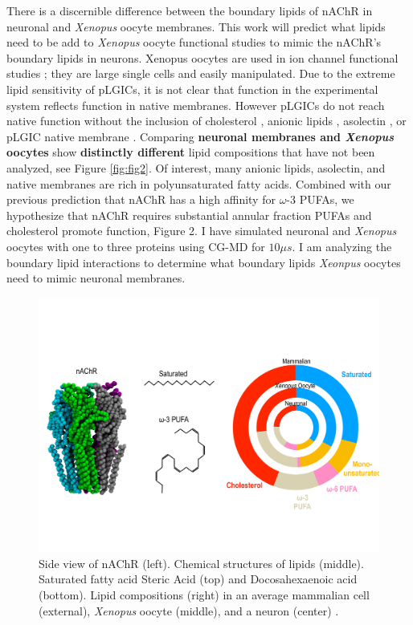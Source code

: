 \documentclass[9pt]{extarticle} %
\begin{document}
There is a discernible difference between the boundary lipids of nAChR in neuronal and \textit{Xenopus} oocyte membranes. This work will predict what lipids need to be add to \textit{Xenopus} oocyte functional studies to mimic the nAChR's boundary lipids in neurons. Xenopus oocytes are used in ion channel functional studies \cite{Conti2013,Cornelison2016,Lee1994}; they are large single cells and easily manipulated. Due to the extreme lipid sensitivity of pLGICs, it is not clear that function in the experimental system reflects function in native membranes. However pLGICs do not reach native function without the inclusion of cholesterol \cite{Fong1987,Jones1988}, anionic lipids \cite{RyanSEDemersCNChewJP1996}, asolectin \cite{Fong1986,Fong1987}, or pLGIC native membrane \cite{Conti2013}. Comparing \textbf{neuronal membranes and \textit{Xenopus} oocytes} show \textbf{distinctly different} lipid compositions that have not been analyzed, see Figure \ref{fig:fig2}.  Of interest, many anionic lipids, asolectin, and native membranes are rich in polyunsaturated fatty acids. Combined with our previous prediction that nAChR has a high affinity for $\omega$-3 PUFAs, we hypothesize that nAChR requires substantial annular fraction PUFAs and cholesterol promote function, Figure 2. I have simulated neuronal and \textit{Xenopus} oocytes with one to three proteins using CG-MD for $10\mu s$. I am analyzing the boundary lipid interactions to determine what boundary lipids \textit{Xeonpus} oocytes need to mimic neuronal membranes.

\begin{figure}
    \center
    \includegraphics[width=.6\linewidth]{Lipid_doughnut.pdf}
    \caption{Side view of nAChR (left). Chemical structures of lipids (middle). Saturated fatty acid Steric Acid (top) and Docosahexaenoic acid (bottom). Lipid compositions (right) in an average mammalian cell (external), \textit{Xenopus} oocyte (middle), and a neuron (center) \cite{Taguchi2010,Isolated1969,Breckenridge1973,Ingolfsson2014a,Gamba2005}.}
    \label{fig:fig1}
\end{figure}
\end{document}

